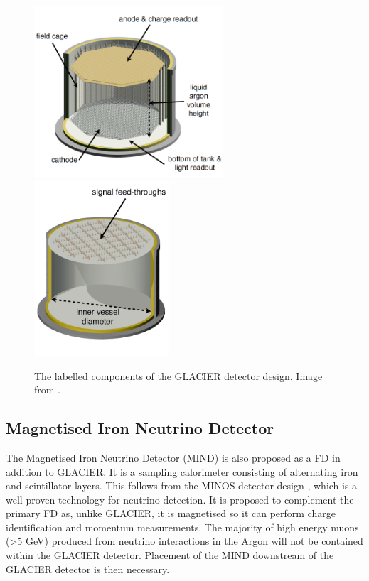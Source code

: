 \begin{figure}[htbp]
\begin{center}
\includegraphics[width=70mm]{Chapter2/figures/glacierDesignOpen1.png}
\includegraphics[width=50mm]{Chapter2/figures/glacierDesignOpen2.png}
\caption{The labelled components of the GLACIER detector design. Image from \cite{lbnoInternal}.}
\label{fig:glacierDesignInner}
\end{center}
\end{figure}

\subsection{Magnetised Iron Neutrino Detector}
The Magnetised Iron Neutrino Detector (MIND) is also proposed as a FD in addition to GLACIER. It is a sampling calorimeter consisting of alternating iron and scintillator layers. This follows from the MINOS detector design \cite{minosExperiment}, which is a well proven technology for neutrino detection. It is proposed to complement the primary FD as, unlike GLACIER, it is magnetised so it can perform charge identification and momentum measurements. The majority of high energy muons (>5 GeV) produced from neutrino interactions in the Argon will not be contained within the GLACIER detector. Placement of the MIND downstream of the GLACIER detector is then necessary.

